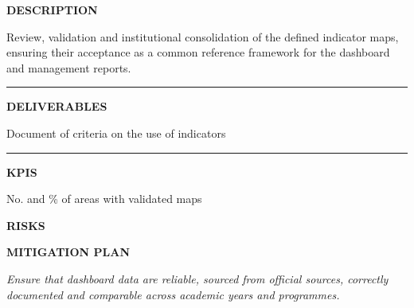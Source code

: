 \documentclass[11pt,a4paper]{scrreprt}
\newcommand{\fieldlabel}[1]{%
  {\footnotesize\sffamily\bfseries\color{mutedcolor}\MakeUppercase{#1}}\par\nopagebreak[4]
}
\newcommand{\fieldsep}{\vspace{3pt}\noindent\textcolor{bordercolor}{\rule{\linewidth}{0.4pt}}\vspace{3pt}\par}
\begin{document}
\begin{tcolorbox}[pabox={dashcolor}{A.P.2.2 \enspace\textbullet\enspace Institutional Validation and Consolidation of Indicator Maps}]

\fieldlabel{Description}
{\small Review, validation and institutional consolidation of the defined indicator maps, ensuring their acceptance as a common reference framework for the dashboard and management reports.}\par
\fieldsep
\fieldlabel{Deliverables}
{\small Document of criteria on the use of indicators}\par
\fieldsep
\fieldlabel{KPIs}
{\small No. and \% of areas with validated maps}\par
\end{tcolorbox}
\begin{tcolorbox}[riskbox]
{\footnotesize\sffamily\bfseries\color{red!50!black} RISKS}\par{}
\end{tcolorbox}
\begin{tcolorbox}[mitbox]
{\footnotesize\sffamily\bfseries\color{green!40!black} MITIGATION PLAN}\par{}
\end{tcolorbox}
\vspace{8pt}

\newpage
{}
{\small\color{mutedcolor}\itshape Ensure that dashboard data are reliable, sourced from official sources, correctly documented and comparable across academic years and programmes.}\par\vspace{6pt}
\end{document}
